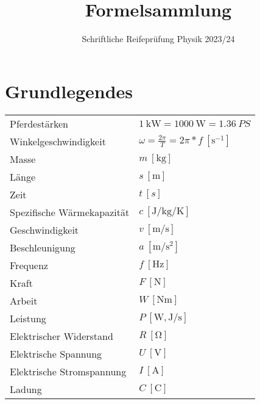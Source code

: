 \documentclass[12pt,a4paper]{paper}
\title{Formelsammlung}
\subtitle{Schriftliche Reifeprüfung Physik 2023/24}
\author{}
\makeatletter
\newcommand{\mathleft}{\@fleqntrue\@mathmargin0pt}
\makeatother
\begin{document}
\maketitle
\mathleft
\section{Grundlegendes}
\begin{tabularx}{\textwidth}{X|X}
	Pferdestärken & $\qty{1}{\kilo\watt} = \qty{1000}{\watt} = \qty{1.36}{PS}$\\
Winkelgeschwindigkeit & $\omega = \frac{2\pi}{T}=2\pi*f\:[\unit{\second^{-1}}]$ \\
Masse & $m\: [\unit{\kilo\gram}]$ \\
Länge & $s\: [\unit{\meter}]$\\
Zeit & $t\:[s]$\\
Spezifische Wärmekapazität & $c\: [\unit{\joule\per\kilo\gram\per\kelvin}]$\\
Geschwindigkeit & $v\:[\unit{\meter\per\second}]$\\
Beschleunigung & $a\:[\unit{\meter\per\second\squared}]$\\
Frequenz & $f\: [\unit{\hertz}]$\\
Kraft & $F\: [\unit{\newton}]$\\
Arbeit & $W \: [\unit{\newton\meter}]$\\
Leistung & $P \: [\unit{\watt},\unit{\joule\per\second}]$\\
Elektrischer Widerstand & $R\:[\unit{\ohm}]$\\
Elektrische Spannung & $U\:[\unit{\volt}]$\\
Elektrische Stromspannung & $I\:[\unit{\ampere}]$\\
Ladung & $C\:[\unit{\coulomb}]$
\end{tabularx}
\end{document}

